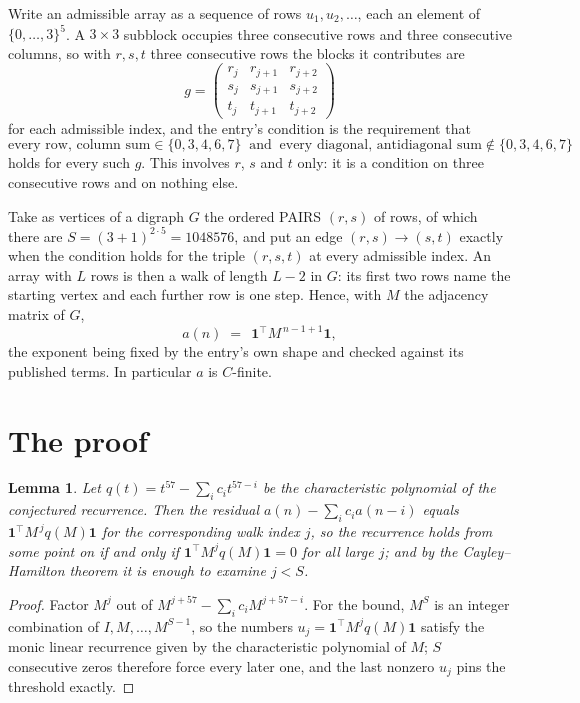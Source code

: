 \documentclass[11pt,a4paper]{article}
\theoremstyle{plain}
\newtheorem{lemma}[theorem]{Lemma}
\theoremstyle{definition}
\begin{document}
Write an admissible array as a sequence of rows $u_1,u_2,\dots$, each an element of
$\{0,\dots,3\}^{5}$. A $3\times3$ subblock occupies three consecutive rows and
three consecutive columns, so with $r,s,t$ three consecutive rows the blocks it
contributes are
\[
g=\begin{pmatrix}r_j&r_{j+1}&r_{j+2}\\ s_j&s_{j+1}&s_{j+2}\\ t_j&t_{j+1}&t_{j+2}\end{pmatrix}
\]
for each admissible index, and the entry's condition is the requirement that
\[
\text{every row, column sum} \in \{0,3,4,6,7\}\ \text{ and }\ \text{every diagonal, antidiagonal sum} \notin \{0,3,4,6,7\}
\]
holds for every such $g$. This involves $r$, $s$ and $t$ only: it is a condition on
three consecutive rows and on nothing else.

Take as vertices of a digraph $G$ the ordered PAIRS $(r,s)$ of rows, of which there are
$S=(3+1)^{2\cdot5}=1048576$, and put an edge $(r,s)\to(s,t)$ exactly when the condition
holds for the triple $(r,s,t)$ at every admissible index. An array with $L$ rows is then a
walk of length $L-2$ in $G$: its first two rows name the starting vertex and each further
row is one step. Hence, with $M$ the adjacency matrix of $G$,
\[
a(n)\;=\;\,\mathbf{1}^{\!\top}M^{\,n-1+1}\mathbf{1},
\]
the exponent being fixed by the entry's own shape and checked against its published terms.
In particular $a$ is $C$-finite.

\section{The proof}

\begin{lemma}\label{lem:crit}
Let $q(t)=t^{57}-\sum_i c_it^{57-i}$ be the characteristic polynomial of the
conjectured recurrence. Then the residual $a(n)-\sum_ic_ia(n-i)$ equals
$\mathbf{1}^{\!\top}M^{\,j}q(M)\mathbf{1}$ for the corresponding walk index
$j$, so the recurrence holds from some point on if and only if
$\mathbf{1}^{\!\top}M^{j}q(M)\mathbf{1}=0$ for all large $j$; and by the
Cayley--Hamilton theorem it is enough to examine $j<S$.
\end{lemma}

\begin{proof}
Factor $M^{j}$ out of $M^{j+57}-\sum_ic_iM^{j+57-i}$. For the bound, $M^{S}$
is an integer combination of $I,M,\dots,M^{S-1}$, so the numbers
$u_j=\mathbf{1}^{\!\top}M^{j}q(M)\mathbf{1}$ satisfy the monic linear recurrence given by
the characteristic polynomial of $M$; $S$ consecutive zeros therefore force every later one,
and the last nonzero $u_j$ pins the threshold exactly.
\end{proof}
\end{document}
